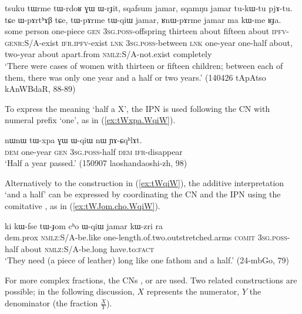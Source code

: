 \begin{exe}
\ex \label{ex:tWqiW}
\gll tsuku tɯrme tɯ-rdoʁ ɣɯ ɯ-rɟit, sqafsum jamar, sqamŋu jamar tu-kɯ-tu pjɤ-tu. tɕe ɯ-pɤrtʰɤβ tɕe, tɯ-pɤrme tɯ-qiɯ jamar, ʁnɯ-pɤrme jamar ma kɯ-me ʁɟa. \\
 some person one-piece \textsc{gen} \textsc{3sg}.\textsc{poss}-offspring thirteen about fifteen about \textsc{ipfv}-\textsc{genr}:S/A-exist \textsc{ifr}.\textsc{ipfv}-exist  \textsc{lnk} \textsc{3sg}.\textsc{poss}-between \textsc{lnk} one-year one-half about, two-year about apart.from \textsc{nmlz}:S/A-not.exist completely  \\
\glt  `There were cases of women with thirteen or fifteen children; between each of them, there was only one year and a half or two years.' (140426 tApAtso kAnWBdaR, 88-89)
\end{exe}

To express the meaning `half a X', the IPN  is used following the CN with numeral prefix `one', as in (\ref{ex:tWxpa.WqiW}).

\begin{exe}
\ex \label{ex:tWxpa.WqiW}
\gll nɯnɯ tɯ-xpa ɣɯ ɯ-qiɯ nɯ ɲɤ-ɕqʰlɤt. \\
\textsc{dem} one-year \textsc{gen} \textsc{3sg}.\textsc{poss}-half \textsc{dem} \textsc{ifr}-disappear \\
\glt  `Half a year passed.' (150907 laoshandaoshi-zh, 98)
\end{exe}

Alternatively to the construction in (\ref{ex:tWqiW}), the additive interpretation  `and a half' can be expressed by coordinating the CN and the IPN  using the comitative , as in (\ref{ex:tWJom.cho.WqiW}).

\begin{exe}
\ex \label{ex:tWJom.cho.WqiW}
\gll ki kɯ-fse tɯ-ɟom cʰo ɯ-qiɯ jamar kɯ-zri ra \\
 dem.prox \textsc{nmlz}:S/A-be.like one-length.of.two.outstretched.arms \textsc{comit} \textsc{3sg}.\textsc{poss}-half about \textsc{nmlz}:S/A-be.long have.to:\textsc{fact} \\
\glt `They need (a piece of leather) long like one fathom and a half.' (24-mbGo, 79)
\end{exe}

For more complex fractions, the CNs ,  or  are used. Two related constructions are possible; in the following discussion, $X$ represents the numerator, $Y$ the denominator (the fraction $\frac{X}{Y}$). 

